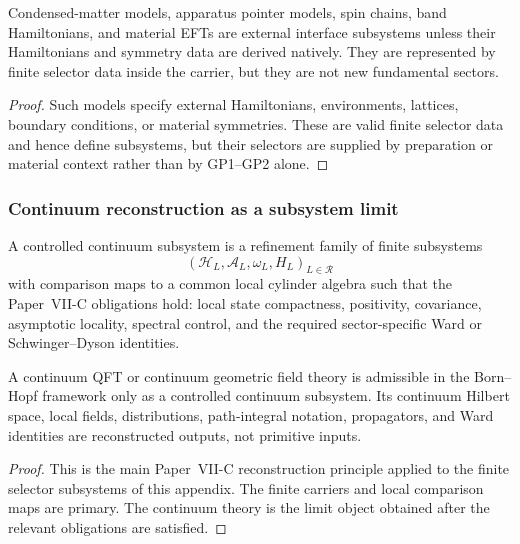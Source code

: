 \documentclass[12pt,a4paper]{article}
\begin{document}
\begin{proposition}
\label{p12:prop:condensed-matter-subsystems}
Condensed-matter models, apparatus pointer models, spin chains, band Hamiltonians, and material EFTs are external interface subsystems unless their Hamiltonians and symmetry data are derived natively.  They are represented by finite selector data inside the carrier, but they are not new fundamental sectors.
\end{proposition}

\begin{proof}
Such models specify external Hamiltonians, environments, lattices, boundary conditions, or material symmetries.  These are valid finite selector data and hence define subsystems, but their selectors are supplied by preparation or material context rather than by GP1--GP2 alone.
\end{proof}


\subsubsection{Continuum reconstruction as a subsystem limit}

\begin{definition}
\label{p12:def:controlled-continuum-subsystem}
A controlled continuum subsystem is a refinement family of finite subsystems
\[
(\mathcal H_L,\mathcal A_L,\omega_L,H_L)_{L\in\mathcal R}
\]
with comparison maps to a common local cylinder algebra such that the Paper~VII-C obligations hold: local state compactness, positivity, covariance, asymptotic locality, spectral control, and the required sector-specific Ward or Schwinger--Dyson identities.
\end{definition}

\begin{theorem}
\label{p12:thm:continuum-theories-subsystem-limits}
A continuum QFT or continuum geometric field theory is admissible in the Born--Hopf framework only as a controlled continuum subsystem.  Its continuum Hilbert space, local fields, distributions, path-integral notation, propagators, and Ward identities are reconstructed outputs, not primitive inputs.
\end{theorem}

\begin{proof}
This is the main Paper~VII-C reconstruction principle applied to the finite selector subsystems of this appendix.  The finite carriers and local comparison maps are primary.  The continuum theory is the limit object obtained after the relevant obligations are satisfied.
\end{proof}
\end{document}
